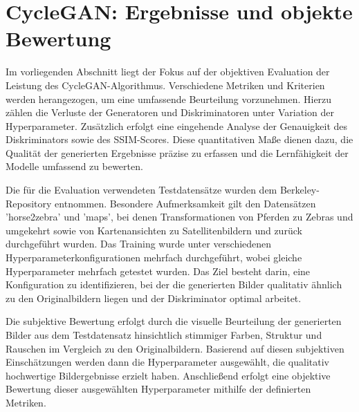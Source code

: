 \section{CycleGAN: Ergebnisse und objekte Bewertung}

Im vorliegenden Abschnitt liegt der Fokus auf der objektiven Evaluation der Leistung des CycleGAN-Algorithmus. Verschiedene Metriken und Kriterien werden herangezogen, um eine umfassende Beurteilung vorzunehmen. Hierzu zählen die Verluste der Generatoren und Diskriminatoren unter Variation der Hyperparameter. Zusätzlich erfolgt eine eingehende Analyse der Genauigkeit des Diskriminators sowie des SSIM-Scores. Diese quantitativen Maße dienen dazu, die Qualität der generierten Ergebnisse präzise zu erfassen und die Lernfähigkeit der Modelle umfassend zu bewerten.

Die für die Evaluation verwendeten Testdatensätze wurden dem Berkeley-Repository entnommen. Besondere Aufmerksamkeit gilt den Datensätzen 'horse2zebra' und 'maps', bei denen Transformationen von Pferden zu Zebras und umgekehrt sowie von Kartenansichten zu Satellitenbildern und zurück durchgeführt wurden. Das Training wurde unter verschiedenen Hyperparameterkonfigurationen mehrfach durchgeführt, wobei gleiche Hyperparameter mehrfach getestet wurden. Das Ziel besteht darin, eine Konfiguration zu identifizieren, bei der die generierten Bilder qualitativ ähnlich zu den Originalbildern liegen und der Diskriminator optimal arbeitet.

Die subjektive Bewertung erfolgt durch die visuelle Beurteilung der generierten Bilder aus dem Testdatensatz hinsichtlich stimmiger Farben, Struktur und Rauschen im Vergleich zu den Originalbildern. Basierend auf diesen subjektiven Einschätzungen werden dann die Hyperparameter ausgewählt, die qualitativ hochwertige Bildergebnisse erzielt haben. Anschließend erfolgt eine objektive Bewertung dieser ausgewählten Hyperparameter mithilfe der definierten Metriken.

\\\newline

